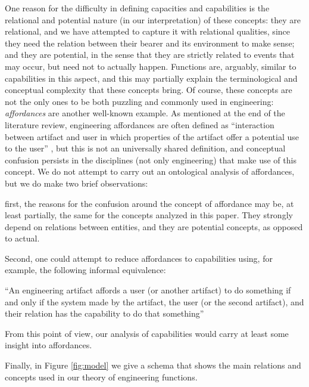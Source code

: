 \documentclass[sw]{iosart2x}
\newcommand{\bflist}{\begin{list}{}{\setlength{\topsep}{2mm}\setlength{\partopsep}{0mm}\setlength{\parsep}{0mm}\setlength{\leftmargin}{9mm}\setlength{\labelwidth}{8mm}}}
\newcommand{\eflist}{\end{list}}
\newcommand{\ExLabel}{\textrm{ex}}
\newcommand{\myex}[1]{\refstepcounter{cntex}\begin{small}{\bf \ExLabel\thecntex\label{ex:#1}}\end{small}}
\newcounter{cntex}
\newcommand{\mytext}[1]{``#1''}
\newcommand{\qquotes}[1]{``#1''}
\begin{document}
One reason for the difficulty in defining capacities and capabilities is the relational and potential nature (in our interpretation) of these concepts: they are relational, and we have attempted to capture it with relational qualities, since they need the relation between their bearer and its environment to make sense; and they are potential, in the sense that they are strictly related to events that may occur, but need not to actually happen.
Functions are, arguably, similar to capabilities in this aspect, 
and this may partially explain the terminological and conceptual complexity that these concepts bring. 
Of course, these concepts are not the only ones to be both puzzling and commonly used in engineering: \textit{affordances} are another well-known example. 
As mentioned at the end of the literature review, engineering affordances are often defined as \qquotes{interaction between artifact and user in which properties of the artifact offer a potential use to the user} \cite{maierAffordanceBasedDesign2009}, but this is not an universally shared definition, and conceptual confusion persists in the disciplines (not only engineering) that make use of this concept.
We do not attempt to carry out an ontological analysis of affordances, but we do make two brief observations:
\begin{itemize}
  \item first, the reasons for the confusion around the concept of affordance may be, at least partially, the same for the concepts analyzed in this paper. They strongly depend on relations between entities, and they are potential concepts, as opposed to actual.
  \item Second, one could attempt to reduce affordances to capabilities using, for example, the following informal equivalence:
  \bflist
    \item[\myex{affordances}] \mytext{An engineering artifact affords a user (or another artifact) to do something if and only if the system made by the artifact, the user (or the second artifact), and their relation has the capability to do that something}
  \eflist 
\end{itemize}
From this point of view, our analysis of capabilities would carry at least some insight into affordances.

Finally, in Figure \ref{fig:model} we give a schema that shows the main relations and concepts used in our theory of engineering functions.
\end{document}
